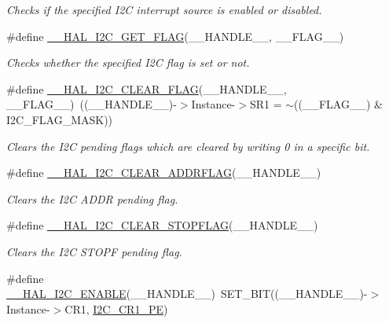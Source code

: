 \begin{DoxyCompactItemize}
\begin{DoxyCompactList}\small\item\em Checks if the specified I2C interrupt source is enabled or disabled. \end{DoxyCompactList}\item 
\#define \hyperlink{group___i2_c___exported___macros_gafbdf01a7dc3183de7af56456cab93551}{\+\_\+\+\_\+\+H\+A\+L\+\_\+\+I2\+C\+\_\+\+G\+E\+T\+\_\+\+F\+L\+AG}(\+\_\+\+\_\+\+H\+A\+N\+D\+L\+E\+\_\+\+\_\+,  \+\_\+\+\_\+\+F\+L\+A\+G\+\_\+\+\_\+)
\begin{DoxyCompactList}\small\item\em Checks whether the specified I2C flag is set or not. \end{DoxyCompactList}\item 
\#define \hyperlink{group___i2_c___exported___macros_ga933e2ea67e86db857a06b70a93be1186}{\+\_\+\+\_\+\+H\+A\+L\+\_\+\+I2\+C\+\_\+\+C\+L\+E\+A\+R\+\_\+\+F\+L\+AG}(\+\_\+\+\_\+\+H\+A\+N\+D\+L\+E\+\_\+\+\_\+,  \+\_\+\+\_\+\+F\+L\+A\+G\+\_\+\+\_\+)~((\+\_\+\+\_\+\+H\+A\+N\+D\+L\+E\+\_\+\+\_\+)-\/$>$Instance-\/$>$S\+R1 = $\sim$((\+\_\+\+\_\+\+F\+L\+A\+G\+\_\+\+\_\+) \& I2\+C\+\_\+\+F\+L\+A\+G\+\_\+\+M\+A\+SK))
\begin{DoxyCompactList}\small\item\em Clears the I2C pending flags which are cleared by writing 0 in a specific bit. \end{DoxyCompactList}\item 
\#define \hyperlink{group___i2_c___exported___macros_ga15a0a1a04971d44f9a1b82cab10af24f}{\+\_\+\+\_\+\+H\+A\+L\+\_\+\+I2\+C\+\_\+\+C\+L\+E\+A\+R\+\_\+\+A\+D\+D\+R\+F\+L\+AG}(\+\_\+\+\_\+\+H\+A\+N\+D\+L\+E\+\_\+\+\_\+)
\begin{DoxyCompactList}\small\item\em Clears the I2C A\+D\+DR pending flag. \end{DoxyCompactList}\item 
\#define \hyperlink{group___i2_c___exported___macros_gae8e94c16809df16411862b11fea781db}{\+\_\+\+\_\+\+H\+A\+L\+\_\+\+I2\+C\+\_\+\+C\+L\+E\+A\+R\+\_\+\+S\+T\+O\+P\+F\+L\+AG}(\+\_\+\+\_\+\+H\+A\+N\+D\+L\+E\+\_\+\+\_\+)
\begin{DoxyCompactList}\small\item\em Clears the I2C S\+T\+O\+PF pending flag. \end{DoxyCompactList}\item 
\#define \hyperlink{group___i2_c___exported___macros_gacff412c47b0c1d63ef3b2a07f65988b7}{\+\_\+\+\_\+\+H\+A\+L\+\_\+\+I2\+C\+\_\+\+E\+N\+A\+B\+LE}(\+\_\+\+\_\+\+H\+A\+N\+D\+L\+E\+\_\+\+\_\+)~S\+E\+T\+\_\+\+B\+IT((\+\_\+\+\_\+\+H\+A\+N\+D\+L\+E\+\_\+\+\_\+)-\/$>$Instance-\/$>$C\+R1, \hyperlink{group___peripheral___registers___bits___definition_ga953b0d38414808db79da116842ed3262}{I2\+C\+\_\+\+C\+R1\+\_\+\+PE})

\end{DoxyCompactItemize}
